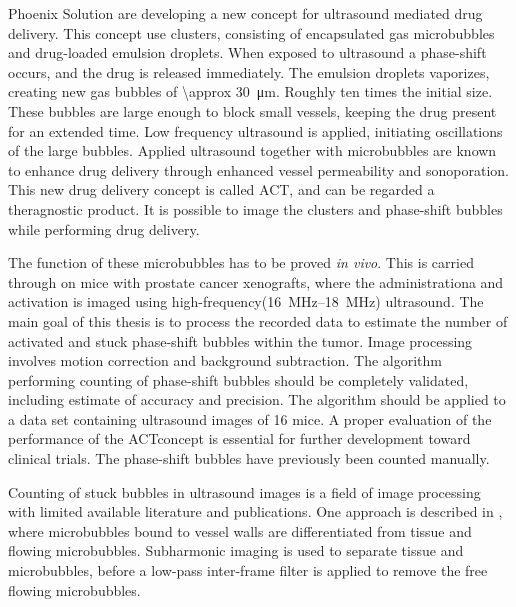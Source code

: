 Phoenix Solution are developing a new concept for ultrasound mediated drug delivery. This concept use clusters, consisting of encapsulated gas microbubbles and drug-loaded emulsion droplets. When exposed to ultrasound a phase-shift occurs, and the drug is released immediately. The emulsion droplets vaporizes, creating new gas bubbles of \SI{\approx 30}{\micro\meter}. Roughly ten times the initial size. These bubbles are large enough to block small vessels, keeping the drug present for an extended time. Low frequency ultrasound is applied, initiating oscillations of the large bubbles. Applied ultrasound together with microbubbles are known to enhance drug delivery through enhanced vessel permeability and sonoporation. This new drug delivery concept is called ACT\textregistered, and can be regarded a theragnostic product. It is possible to image the clusters and phase-shift bubbles while performing drug delivery.

The function of these microbubbles has to be proved \textit{in vivo}. This is carried through on mice with prostate cancer xenografts, where the administrationa and activation is imaged using high-frequency(\SIrange{16}{18}{\mega\hertz}) ultrasound. The main goal of this thesis is to process the recorded data to estimate the number of activated and stuck phase-shift bubbles within the tumor. Image processing involves motion correction and background subtraction. The algorithm performing counting of phase-shift bubbles should be completely validated, including estimate of accuracy and precision. The algorithm should be applied to a data set containing ultrasound images of 16 mice. A proper evaluation of the performance of the ACT\textregistered concept is essential for further development toward clinical trials. The phase-shift bubbles have previously been counted manually. 

Counting of stuck bubbles in ultrasound images is a field of image processing with limited available literature and publications. One approach is described in \cite{Needles2009}, where microbubbles bound to vessel walls are differentiated from tissue and flowing microbubbles. Subharmonic imaging is used to separate tissue and microbubbles, before a low-pass inter-frame filter is applied to remove the free flowing microbubbles. 








